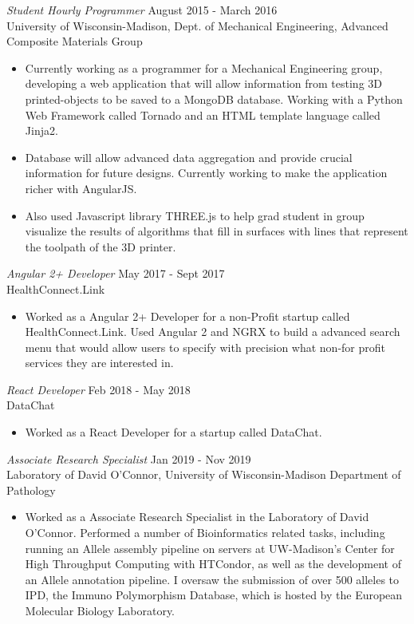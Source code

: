 \documentclass[margin]{res}
\begin{document}
\begin{resume}
 {\sl Student Hourly Programmer} \hfill August 2015 - March 2016 \\
 University of Wisconsin-Madison, Dept. of Mechanical Engineering, Advanced Composite Materials Group
 \begin{itemize}  \itemsep -2pt
  \item Currently working as a programmer for a Mechanical Engineering group, developing a web application that will allow information from testing 3D printed-objects to be saved to a MongoDB database. Working with a Python Web Framework called Tornado and an HTML template language called Jinja2.
  \item Database will allow advanced data aggregation and provide crucial information for future designs. Currently working to make the application richer with AngularJS.
  \item Also used Javascript library THREE.js to help grad student in group visualize the results of algorithms that fill in surfaces with lines that represent the toolpath of the 3D printer.
 \end{itemize}

 {\sl Angular 2+ Developer} \hfill May 2017 - Sept 2017\\
HealthConnect.Link
 \begin{itemize}  \itemsep -2pt
  \item Worked as a Angular 2+ Developer for a non-Profit startup called HealthConnect.Link. Used Angular 2 and NGRX to build a advanced search menu that would allow users to specify with precision what non-for profit services they are interested in.
 \end{itemize}

 {\sl React Developer} \hfill Feb 2018 - May 2018\\
DataChat
 \begin{itemize}  \itemsep -2pt
  \item Worked as a React Developer for a startup called DataChat.
 \end{itemize}

 {\sl Associate Research Specialist} \hfill Jan 2019 - Nov 2019\\
Laboratory of David O'Connor, University of Wisconsin-Madison Department of Pathology
 \begin{itemize}  \itemsep -2pt
  \item Worked as a Associate Research Specialist in the Laboratory of David O'Connor. Performed a number of Bioinformatics related tasks, including running an Allele assembly pipeline on servers at UW-Madison's Center for High Throughput Computing with HTCondor, as well as the development of an Allele annotation pipeline. I oversaw the submission of over 500 alleles to IPD, the Immuno Polymorphism Database, which is hosted by the European Molecular Biology Laboratory.
 \end{itemize}


\end{resume}
\end{document}
